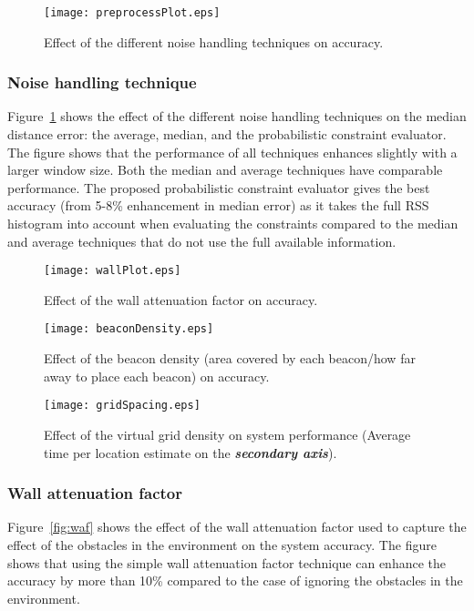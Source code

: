 \documentclass[conference]{IEEEtran}
\begin{document}
\begin{figure}[!t]
\centering
\texttt{[image: preprocessPlot.eps]}
\caption{Effect of the different noise handling techniques on accuracy.}
\label{fig:preprocess}
\end{figure}
\subsubsection{Noise handling technique}

Figure~\ref{fig:preprocess} shows the effect of the different noise handling techniques on the median distance error: the average, median, and the probabilistic constraint evaluator. The figure shows that the performance of all techniques enhances slightly with a larger window size. Both the median and average techniques have comparable performance. The proposed probabilistic constraint evaluator gives the best accuracy (from 5-8\% enhancement in median error) as it takes the full RSS histogram into account when evaluating the constraints compared to the median and average techniques that do not use the full available information.

\begin{figure*}[!t]
\noindent\begin{minipage}[t]{0.3\linewidth}
\centering
\texttt{[image: wallPlot.eps]}
\caption{Effect of the wall attenuation factor on accuracy.}
\label{fig:waf}
\end{minipage}
\hfill
\begin{minipage}[t]{0.3\linewidth}
\centering
\texttt{[image: beaconDensity.eps]}
\caption{Effect of the beacon density (area covered by each beacon/how far away to place each beacon) on accuracy.}
\label{fig:b_density}
\end{minipage}
\hfill
\begin{minipage}[t]{0.3\linewidth}
\centering
\texttt{[image: gridSpacing.eps]}
\caption{Effect of the virtual grid density on system performance (Average time per location estimate on the \textbf{\emph{secondary axis}}).}
\label{fig:vgrid}
\end{minipage}
\end{figure*}

\subsubsection{Wall attenuation factor}
Figure~\ref{fig:waf} shows the effect of the wall attenuation factor used to capture the effect of the 
obstacles in the environment on the system accuracy. The figure shows that using the simple wall attenuation factor technique can enhance the accuracy by more than 10\% compared to the case of ignoring the obstacles in the environment.
\end{document}
